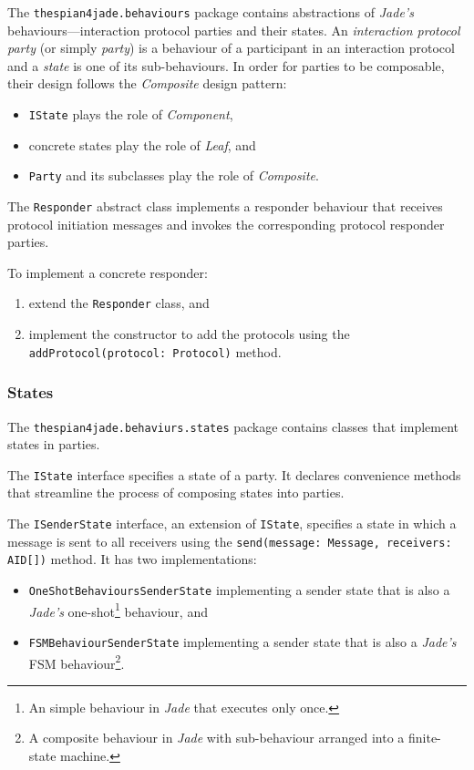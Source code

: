 The \texttt{thespian4jade.behaviours} package contains abstractions of \textit{Jade's} behaviours---interaction protocol parties and their states.
An \textit{interaction protocol party} (or simply \textit{party}) is a behaviour of a participant in an interaction protocol and a \textit{state} is one of its sub-behaviours.
In order for parties to be composable, their design follows the \textit{Composite} design pattern:
\begin{itemize}
	\item \texttt{IState} plays the role of \textit{Component},
	\item concrete states play the role of \textit{Leaf}, and
	\item \texttt{Party} and its subclasses play the role of \textit{Composite}.
\end{itemize}

The \texttt{Responder} abstract class implements a responder behaviour that receives protocol initiation messages and invokes the corresponding protocol responder parties.

To implement a concrete responder:
\begin{enumerate}
	\item extend the \texttt{Responder} class, and
	\item implement the constructor to add the protocols using the \texttt{addProtocol(protocol: Protocol)} method.
\end{enumerate}

\subsubsection{States}

The \texttt{thespian4jade.behaviurs.states} package contains classes that implement states in parties.

The \texttt{IState} interface specifies a state of a party.
It declares convenience methods that streamline the process of composing states into parties.

The \texttt{ISenderState} interface, an extension of \texttt{IState}, specifies a state in which a message is sent to all receivers using the \texttt{send(message: Message, receivers: AID[])} method.
It has two implementations:
\begin{itemize}
	\item \texttt{OneShotBehavioursSenderState} implementing a sender state that is also a \textit{Jade's} one-shot\footnote{An simple behaviour in \textit{Jade} that executes only once.} behaviour, and
	\item \texttt{FSMBehaviourSenderState} implementing a sender state that is also a \textit{Jade's} FSM behaviour\footnote{A composite behaviour in \textit{Jade} with sub-behaviour arranged into a finite-state machine.}.
\end{itemize}

